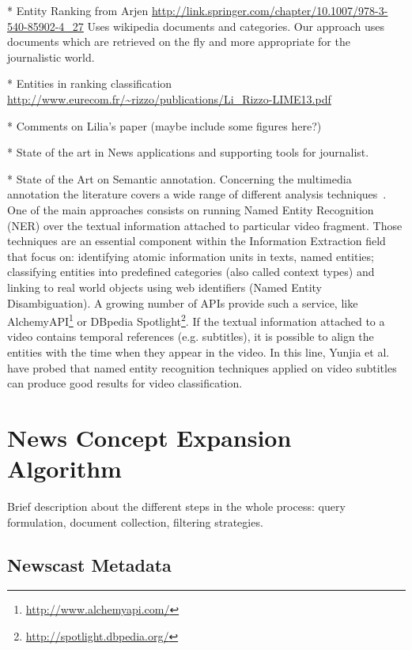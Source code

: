 \documentclass{llncs}
\begin{document}
* Entity Ranking from Arjen
\url{http://link.springer.com/chapter/10.1007/978-3-540-85902-4_27}
Uses wikipedia documents and categories. Our approach uses documents which are retrieved on the fly and more appropriate for the journalistic world.

* Entities in ranking classification
\url{http://www.eurecom.fr/~rizzo/publications/Li_Rizzo-LIME13.pdf}

* Comments on Lilia's paper (maybe include some figures here?)

* State of the art in News applications and supporting tools for journalist.

* State of the Art on Semantic annotation.
Concerning the multimedia annotation the literature covers a wide range of different analysis techniques~\cite{ballan2011event}. One of the main approaches consists on running Named Entity Recognition (NER) over the textual information attached to particular video fragment. Those techniques are an essential component within the Information Extraction field that focus on: identifying atomic information units in texts, named entities; classifying entities into predefined categories (also called context types) and linking to real world objects using web identifiers (Named Entity Disambiguation). A growing number of APIs provide such a service, like AlchemyAPI\footnote{\fontsize{8pt}{1em}\selectfont \url{http://www.alchemyapi.com/}} or DBpedia Spotlight\footnote{\fontsize{8pt}{1em}\selectfont \url{http://spotlight.dbpedia.org/}}. If the textual information attached to a video contains temporal references (e.g. subtitles), it is possible to align the entities with the time when they appear in the video. In this line, Yunjia et al.~\cite{yunjia2013} have probed that named entity recognition techniques applied on video subtitles can produce good results for video classification. 

\section{News Concept Expansion Algorithm}
\label{sec:ConceptExpansion}

Brief description about the different steps in the whole process: query formulation, document collection, filtering strategies.

\subsection{Newscast Metadata}
\end{document}
